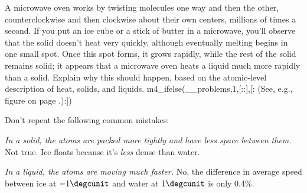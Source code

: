 A microwave oven works by twisting molecules one way and
then the other, counterclockwise and then clockwise about
their own centers, millions of times a second. If you put an
ice cube or a stick of butter in a microwave, you'll observe
that the solid doesn't heat very quickly, although
eventually melting begins in one small spot. Once this
spot forms, it grows rapidly, while the rest of the solid
remains solid; it appears
that a microwave oven heats a liquid much more
rapidly than a solid. Explain why this should happen, based
on the atomic-level description of heat, solids, and liquids.
m4_ifelse(__problems,1,[::],[:%
(See, e.g., figure  on page \pageref{fig:random-motion}.):])

Don't repeat the following common mistakes:

\noindent\emph{In a solid, the atoms are packed more tightly and have less
space between them.} Not true. Ice floats because it's \emph{less} dense
than water.

\noindent\emph{In a liquid, the atoms are moving much faster.} No, the difference
in average speed between ice at $-1\degcunit$ and water at $1\degcunit$ is
only 0.4\%.
